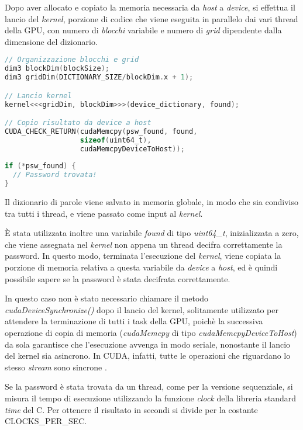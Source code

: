 \documentclass[10pt,twocolumn,letterpaper]{article}
\begin{document}
Dopo aver allocato e copiato la memoria necessaria da \textit{host} a \textit{device}, si effettua il lancio del \textit{kernel}, porzione di codice che viene eseguita in parallelo dai vari thread della GPU, con numero di \textit{blocchi} variabile e numero di \textit{grid} dipendente dalla dimensione del dizionario.
\newline

\begin{lstlisting}[basicstyle=\scriptsize, language=C, frame=single, caption={Esempio di lancio del kernel in CUDA},captionpos=b]
// Organizzazione blocchi e grid
dim3 blockDim(blockSize);
dim3 gridDim(DICTIONARY_SIZE/blockDim.x + 1);

// Lancio kernel
kernel<<<gridDim, blockDim>>>(device_dictionary, found);

// Copio risultato da device a host
CUDA_CHECK_RETURN(cudaMemcpy(psw_found, found, 
                  sizeof(uint64_t), 
                  cudaMemcpyDeviceToHost));
                  
if (*psw_found) {
  // Password trovata!
}
\end{lstlisting}

Il dizionario di parole viene salvato in memoria globale, in modo che sia condiviso tra tutti i thread, e viene passato come input al \textit{kernel}.

È stata utilizzata inoltre una variabile \textit{found} di tipo \textit{uint64\_t}, inizializzata a zero, che viene assegnata nel \textit{kernel} non appena un thread decifra correttamente la password. In questo modo, terminata l'esecuzione del \textit{kernel}, viene copiata la porzione di memoria relativa a questa variabile da \textit{device} a \textit{host}, ed è quindi possibile sapere se la password è stata decifrata correttamente.

In questo caso non è stato necessario chiamare il metodo \textit{cudaDeviceSynchronize()} dopo il lancio del kernel, solitamente utilizzato per attendere la terminazione di tutti i task della GPU, poichè la successiva operazione di copia di memoria (\textit{cudaMemcpy} di tipo \textit{cudaMemcpyDeviceToHost}) da sola garantisce che l'esecuzione avvenga in modo seriale, nonostante il lancio del kernel sia asincrono. 
In CUDA, infatti, tutte le operazioni che riguardano lo stesso \textit{stream} sono sincrone \cite{CUDA_SYNC}.

Se la password è stata trovata da un thread, come per la versione sequenziale, si misura il tempo di esecuzione utilizzando la funzione \textit{clock} della libreria standard \textit{time} del C. Per ottenere il risultato in secondi si divide per la costante CLOCKS\_PER\_SEC.\newline
\end{document}
